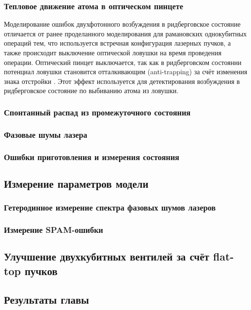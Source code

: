 \subsubsection{Тепловое движение атома в оптическом пинцете}

Моделирование ошибок двухфотонного возбуждения в ридберговское состояние отличается от ранее проделанного моделирования для рамановских однокубитных операций тем, что используется встречная конфигурация лазерных пучков, а также происходит выключение оптической ловушки на время проведения операции. Оптический пинцет выключается, так как в ридберговском состоянии потенциал ловушки становится отталкивающим (anti-trapping) за счёт изменения знака отстройки \cite{Browayes,Beguin,grimm1999optical}. Этот эффект используется для детектирования возбуждения в ридберговское состояние по выбиванию атома из ловушки\cite{Beguin}.


\subsubsection{Спонтанный распад из промежуточного состояния}

\subsubsection{Фазовые шумы лазера}

\subsubsection{Ошибки приготовления и измерения состояния}

\subsection{Измерение параметров модели}

\subsubsection{Гетеродинное измерение спектра фазовых шумов лазеров}



\subsubsection{Измерение SPAM-ошибки}

\subsection{Улучшение двухкубитных вентилей за счёт flat-top пучков}

\subsection{Результаты главы}


\newpage